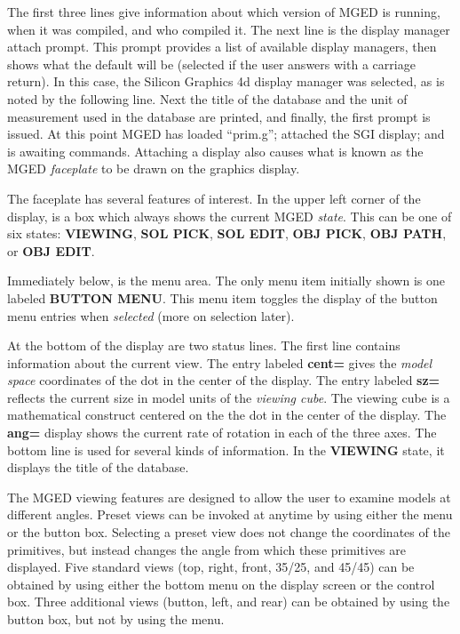 The first three lines give information about which version of MGED is running,
when it was compiled, and who compiled it.  The next line is the display
manager attach prompt.  This prompt provides a list of available display
managers, then shows what the default will be (selected if the user answers
with a carriage return).  In this case, the Silicon Graphics 4d display
manager was selected, as is noted by the following line.
Next the title of the database and
the unit of measurement used in the database are printed,
and finally, the first prompt is issued.
At this point MGED has loaded ``prim.g''; attached the SGI display;
and is awaiting commands.  Attaching a display also causes what
is known as the MGED {\sl faceplate} to be drawn on the graphics display.

The faceplate has several features of interest.  In the upper left corner
of the display, is a box which always shows the current MGED {\sl state}.
This can be one of six states:  {\bf VIEWING}, {\bf SOL PICK},
{\bf SOL EDIT}, {\bf OBJ PICK}, {\bf OBJ PATH}, or {\bf OBJ EDIT}.

Immediately below, is the menu area.  The only menu item initially shown is
one labeled {\bf BUTTON MENU}.  This menu item toggles the display of the
button menu entries when {\sl selected} (more on selection later).

At the bottom of the display are two status lines.  The first line
contains information about the current view.
The entry labeled {\bf cent=} gives the {\sl model space} coordinates
of the dot in the center of the display.
The entry labeled {\bf sz=} reflects the current size in model units of
the {\sl viewing cube}.  The viewing cube is a mathematical construct
centered on the the dot in the center of the display.  The {\bf ang=}
display shows the current rate of rotation in each of the three axes.
The bottom line is used for several kinds of information.
In the {\bf VIEWING} state, it displays the title of the database.

The MGED viewing features are designed to allow the user to examine
models at different angles.
Preset views can be invoked at
anytime by using either the menu or the button box.
Selecting a preset view does
not change the coordinates of the primitives,
but instead changes the angle from which these primitives are
displayed.  Five standard views (top, right, front, 35/25, and 45/45) can
be obtained by using either the bottom menu on the display screen or the
control box.
Three additional views (button, left, and rear) can be obtained
by using the button box, but not by using the menu.

